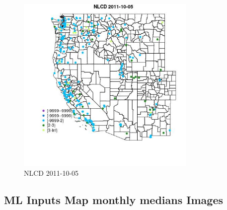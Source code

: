 \clearpage 

\begin{figure} 
\centering  
\includegraphics[width=0.77\textwidth]{Code_Outputs/ML_input_report_ML_input_PM25_Step5_part_d_de_duplicated_aves_ML_input_MapObsNLCD2011-10-05.jpg} 
\caption{\label{fig:ML_input_report_ML_input_PM25_Step5_part_d_de_duplicated_aves_ML_inputMapObsNLCD2011-10-05}NLCD 2011-10-05} 
\end{figure} 
 

\subsection{ML Inputs Map monthly medians Images} 
 

